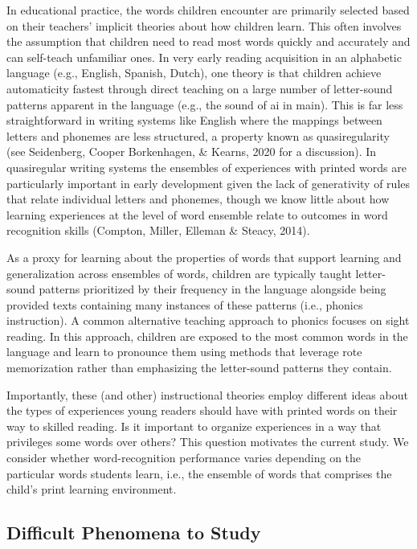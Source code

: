 \documentclass[
  ,man,floatsintext]{apa6}
\begin{document}
In educational practice, the words children encounter are primarily selected based on their teachers' implicit theories about how children learn. This often involves the assumption that children need to read most words quickly and accurately and can self-teach unfamiliar ones. In very early reading acquisition in an alphabetic language (e.g., English, Spanish, Dutch), one theory is that children achieve automaticity fastest through direct teaching on a large number of letter-sound patterns apparent in the language (e.g., the sound of ai in main). This is far less straightforward in writing systems like English where the mappings between letters and phonemes are less structured, a property known as quasiregularity (see Seidenberg, Cooper Borkenhagen, \& Kearns, 2020 for a discussion). In quasiregular writing systems the ensembles of experiences with printed words are particularly important in early development given the lack of generativity of rules that relate individual letters and phonemes, though we know little about how learning experiences at the level of word ensemble relate to outcomes in word recognition skills (Compton, Miller, Elleman \& Steacy, 2014).

As a proxy for learning about the properties of words that support learning and generalization across ensembles of words, children are typically taught letter-sound patterns prioritized by their frequency in the language alongside being provided texts containing many instances of these patterns (i.e., phonics instruction). A common alternative teaching approach to phonics focuses on sight reading. In this approach, children are exposed to the most common words in the language and learn to pronounce them using methods that leverage rote memorization rather than emphasizing the letter-sound patterns they contain.

Importantly, these (and other) instructional theories employ different ideas about the types of experiences young readers should have with printed words on their way to skilled reading. Is it important to organize experiences in a way that privileges some words over others? This question motivates the current study. We consider whether word-recognition performance varies depending on the particular words students learn, i.e., the ensemble of words that comprises the child's print learning environment.

\hypertarget{difficult-phenomena-to-study}{%
\subsection{Difficult Phenomena to Study}\label{difficult-phenomena-to-study}}
\end{document}
